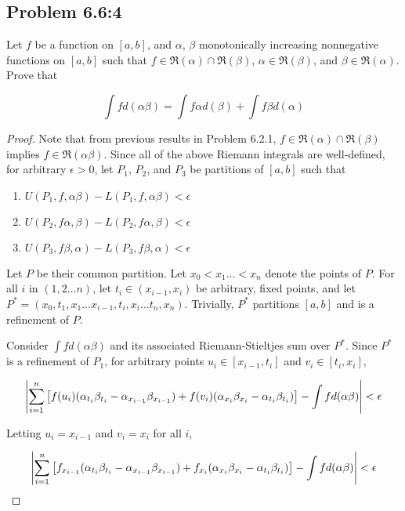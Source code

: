 \documentclass{amsart}
\DeclarePairedDelimiter{\abs}{\lvert}{\rvert}
\newcommand{\RiemannIntable}{
  \mathfrak{R}
}
\begin{document}
\subsection*{Problem 6.6:4}

Let $f$ be a function on $[a, b]$, and $\alpha$, $\beta$ monotonically increasing nonnegative functions on $[a, b]$ such that $f \in \RiemannIntable(\alpha) \cap \RiemannIntable(\beta)$, $\alpha \in \RiemannIntable(\beta)$, and $\beta \in \RiemannIntable(\alpha)$. Prove that

\[
\int f d(\alpha \beta) = \int f \alpha d(\beta) + \int f \beta d(\alpha)
\]

\begin{proof}

Note that from previous results in Problem 6.2.1, $f \in \RiemannIntable(\alpha) \cap \RiemannIntable(\beta)$ implies $f \in \RiemannIntable(\alpha \beta)$. Since all of the above Riemann integrals are well-defined, for arbitrary $\epsilon > 0$, let $P_1$, $P_2$, and $P_3$ be partitions of $[a, b]$ such that

\begin{enumerate}
\item $U(P_1, f, \alpha\beta) - L(P_1, f, \alpha\beta) < \epsilon$
\item $U(P_2, f\alpha, \beta) - L(P_2, f\alpha, \beta) < \epsilon$
\item $U(P_3, f\beta, \alpha) - L(P_3, f\beta, \alpha) < \epsilon$
\end{enumerate}

Let $P$ be their common partition. Let $x_0 < x_1 ... < x_n$ denote the points of $P$. For all $i$ in $(1, 2...n)$, let $t_i \in (x_{i-1}, x_i)$ be arbitrary, fixed points, and let $P^* = (x_0, t_1, x_1 ... x_{i-1}, t_i, x_i ... t_n, x_n)$. Trivially, $P^*$ partitions $[a, b]$ and is a refinement of $P$.

Consider $\int f d(\alpha\beta)$ and its associated Riemann-Stieltjes sum over $P^*$. Since $P^*$ is a refinement of $P_1$, for arbitrary points $u_i \in [x_{i-1}, t_i]$ and $v_i \in [t_i, x_i]$,

\[
\abs*{ \sum_{i=1}^n \left[f(u_i)(\alpha_{t_i}\beta_{t_i} - \alpha_{x_{i-1}}\beta_{x_{i-1}})
+ f(v_i)(\alpha_{x_i}\beta_{x_i} - \alpha_{t_i}\beta_{t_i})\right]
- \int f d(\alpha\beta)}
< \epsilon
\]

Letting $u_i = x_{i-1}$ and $v_i = x_i$ for all $i$,

\[
\abs*{ \sum_{i=1}^n \left[f_{x_{i-1}}(\alpha_{t_i}\beta_{t_i} - \alpha_{x_{i-1}}\beta_{x_{i-1}})
+ f_{x_i}(\alpha_{x_i}\beta_{x_i} - \alpha_{t_i}\beta_{t_i})\right]
- \int f d(\alpha\beta)}
< \epsilon
\]


\end{proof}
\end{document}
